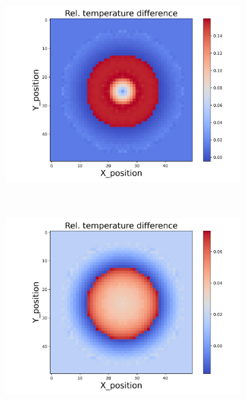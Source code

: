 \begin{figure}[h]
\begin{minipage}{\textwidth}
\begin{subfigure}{0.325\textwidth}
        \end{subfigure}
        \begin{subfigure}{0.325\textwidth}
            \centering
            \includegraphics[width=\textwidth]{figures/raw_data/21/linear/T_bias.jpg}
        \end{subfigure}
    \end{minipage}\\
    \begin{minipage}{\textwidth}
        \centering
        \begin{subfigure}{0.325\textwidth}
            \centering
            \includegraphics[width=\textwidth]{figures/raw_data/22/linear/T_bias.jpg}

\end{subfigure}
\end{minipage}
\end{figure}

